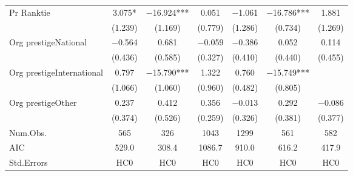 \begin{table}
\begin{tabular}[t]{lcccccc}
Pr Ranktie & \num{3.075}* & \num{-16.924}*** & \num{0.051} & \num{-1.061} & \num{-16.786}*** & \num{1.881}\\
 & (\num{1.239}) & (\num{1.169}) & (\num{0.779}) & (\num{1.286}) & (\num{0.734}) & (\num{1.269})\\
Org prestigeNational & \num{-0.564} & \num{0.681} & \num{-0.059} & \num{-0.386} & \num{0.052} & \num{0.114}\\
 & (\num{0.436}) & (\num{0.585}) & (\num{0.327}) & (\num{0.410}) & (\num{0.440}) & (\num{0.455})\\
Org prestigeInternational & \num{0.797} & \num{-15.790}*** & \num{1.322} & \num{0.760} & \num{-15.749}*** & \\
 & (\num{1.066}) & (\num{1.060}) & (\num{0.960}) & (\num{0.482}) & (\num{0.805}) & \\
Org prestigeOther & \num{0.237} & \num{0.412} & \num{0.356} & \num{-0.013} & \num{0.292} & \num{-0.086}\\
 & (\num{0.374}) & (\num{0.526}) & (\num{0.259}) & (\num{0.326}) & (\num{0.381}) & (\num{0.377})\\
\midrule
Num.Obs. & \num{565} & \num{326} & \num{1043} & \num{1299} & \num{561} & \num{582}\\
AIC & \num{529.0} & \num{308.4} & \num{1086.7} & \num{910.0} & \num{616.2} & \num{417.9}\\
Std.Errors & HC0 & HC0 & HC0 & HC0 & HC0 & HC0\\
\bottomrule
\end{tabular}
\end{table}
